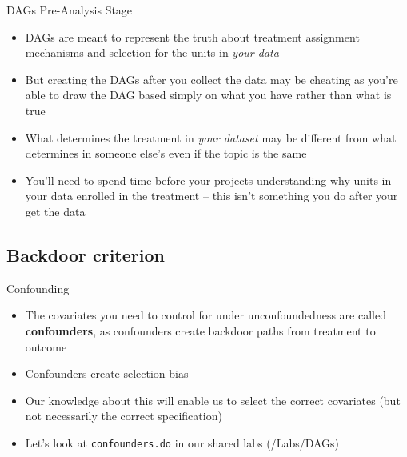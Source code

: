 \begin{frame}{DAGs Pre-Analysis Stage}

	\begin{itemize}
	\item DAGs are meant to represent the truth about treatment assignment mechanisms and selection for the units in \emph{your data} 
	\item But creating the DAGs after you collect the data may be cheating as you're able to draw the DAG based simply on what you have rather than what is true
	\item What determines the treatment in \emph{your dataset} may be different from what determines in someone else's even if the topic is the same
	\item You'll need to spend time before your projects understanding why units in your data enrolled in the treatment -- this isn't something you do after your get the data 
	\end{itemize}
\end{frame}






\subsection{Backdoor criterion}


\begin{frame}{Confounding}

  \begin{itemize}
  	\item The covariates you need to control for under unconfoundedness are called \textbf{confounders}, as confounders create backdoor paths from treatment to outcome
          \item Confounders create selection bias \\

          \begin{center}
          \end{center}

          \item Our knowledge about this will enable us to select the correct covariates (but not necessarily the correct specification)
          \item Let's look at \texttt{confounders.do} in our shared labs (/Labs/DAGs)
  \end{itemize}
\end{frame}

